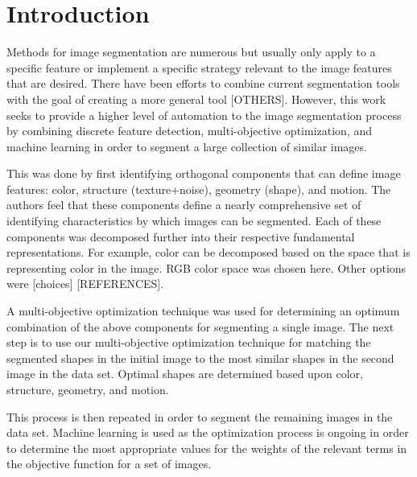 \section{Introduction}
Methods for image segmentation are numerous but usually only apply to a specific feature or implement a specific strategy relevant to the image features that are desired. There have been efforts to combine current segmentation tools with the goal of creating a more general tool \cite{fergus03} [OTHERS]. However, this work seeks to provide a higher level of automation to the image segmentation process by combining discrete feature detection, multi-objective optimization, and machine learning in order to segment a large collection of similar images.

This was done by first identifying orthogonal components that can define image features: color, structure (texture+noise), geometry (shape), and motion. The authors feel that these components define a nearly comprehensive set of identifying characteristics by which images can be segmented. Each of these components was decomposed further into their respective fundamental representations. For example, color can be decomposed based on the space that is representing color in the image. RGB color space was chosen here. Other options were [choices] [REFERENCES].

A multi-objective optimization technique was used for determining an optimum combination of the above components for segmenting a single image. The next step is to use our multi-objective optimization technique for matching the segmented shapes in the initial image to the most similar shapes in the second image in the data set. Optimal shapes are determined based upon color, structure, geometry, and motion.

This process is then repeated in order to segment the remaining images in the data set. Machine learning is used as the optimization process is ongoing in order to determine the most appropriate values for the weights of the relevant terms in the objective function for a set of images.
